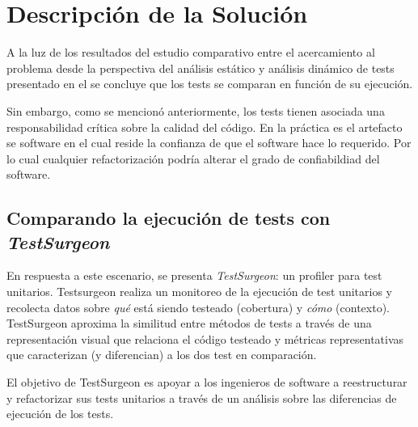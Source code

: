 \chapter{Descripción de la Solución}



\par A la luz de los resultados del estudio comparativo entre el acercamiento al problema desde la perspectiva del análisis estático y análisis dinámico de  tests presentado en el  se concluye que los tests se comparan en función de su ejecución. 

\par Sin embargo, como se mencionó anteriormente, los tests tienen asociada una responsabilidad crítica sobre la calidad del código. En la práctica es el artefacto se software en el cual reside la confianza de que el software hace lo requerido. Por lo cual cualquier refactorización podría alterar el grado de confiabildiad del software.


\section{Comparando la ejecución de tests con \emph{TestSurgeon}}

\par En respuesta a este escenario, se presenta \emph{TestSurgeon}: un profiler para test unitarios. Testsurgeon realiza un monitoreo de la ejecución de test unitarios y recolecta datos sobre \emph{qué} está siendo testeado (cobertura) y \emph{cómo} (contexto). TestSurgeon aproxima la similitud entre métodos de tests a través de una representación visual que relaciona el código testeado y métricas representativas que caracterizan (y diferencian) a los dos test en comparación. 

\par El objetivo de TestSurgeon es apoyar a los ingenieros de software a reestructurar y refactorizar sus tests unitarios a través de un análisis sobre las diferencias de ejecución de los tests.


